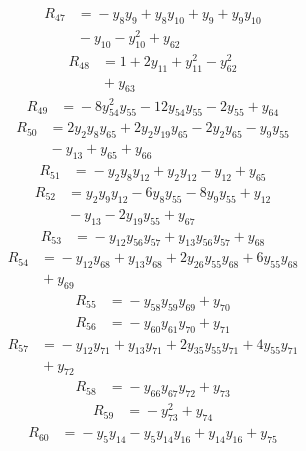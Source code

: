 \begin{align*}
R_{47} &={} -y_{8}y_{9} +y_{8}y_{10} +y_{9} +y_{9}y_{10} \\
 &{} -y_{10} -y_{10}^{2} +y_{62}
\end{align*}
\begin{align*}
R_{48} &={} 1 +2y_{11} +y_{11}^{2} -y_{62}^{2} \\
 &{} +y_{63}
\end{align*}
\begin{align*}
R_{49} &={} -8y_{54}^{2}y_{55} -12y_{54}y_{55} -2y_{55} +y_{64}
\end{align*}
\begin{align*}
R_{50} &={} 2y_{2}y_{8}y_{65} +2y_{2}y_{19}y_{65} -2y_{2}y_{65} -y_{9}y_{55} \\
 &{} -y_{13} +y_{65} +y_{66}
\end{align*}
\begin{align*}
R_{51} &={} -y_{2}y_{8}y_{12} +y_{2}y_{12} -y_{12} +y_{65}
\end{align*}
\begin{align*}
R_{52} &={} y_{2}y_{9}y_{12} -6y_{8}y_{55} -8y_{9}y_{55} +y_{12} \\
 &{} -y_{13} -2y_{19}y_{55} +y_{67}
\end{align*}
\begin{align*}
R_{53} &={} -y_{12}y_{56}y_{57} +y_{13}y_{56}y_{57} +y_{68}
\end{align*}
\begin{align*}
R_{54} &={} -y_{12}y_{68} +y_{13}y_{68} +2y_{26}y_{55}y_{68} +6y_{55}y_{68} \\
 &{} +y_{69}
\end{align*}
\begin{align*}
R_{55} &={} -y_{58}y_{59}y_{69} +y_{70}
\end{align*}
\begin{align*}
R_{56} &={} -y_{60}y_{61}y_{70} +y_{71}
\end{align*}
\begin{align*}
R_{57} &={} -y_{12}y_{71} +y_{13}y_{71} +2y_{35}y_{55}y_{71} +4y_{55}y_{71} \\
 &{} +y_{72}
\end{align*}
\begin{align*}
R_{58} &={} -y_{66}y_{67}y_{72} +y_{73}
\end{align*}
\begin{align*}
R_{59} &={} -y_{73}^{2} +y_{74}
\end{align*}
\begin{align*}
R_{60} &={} -y_{5}y_{14} -y_{5}y_{14}y_{16} +y_{14}y_{16} +y_{75}
\end{align*}
